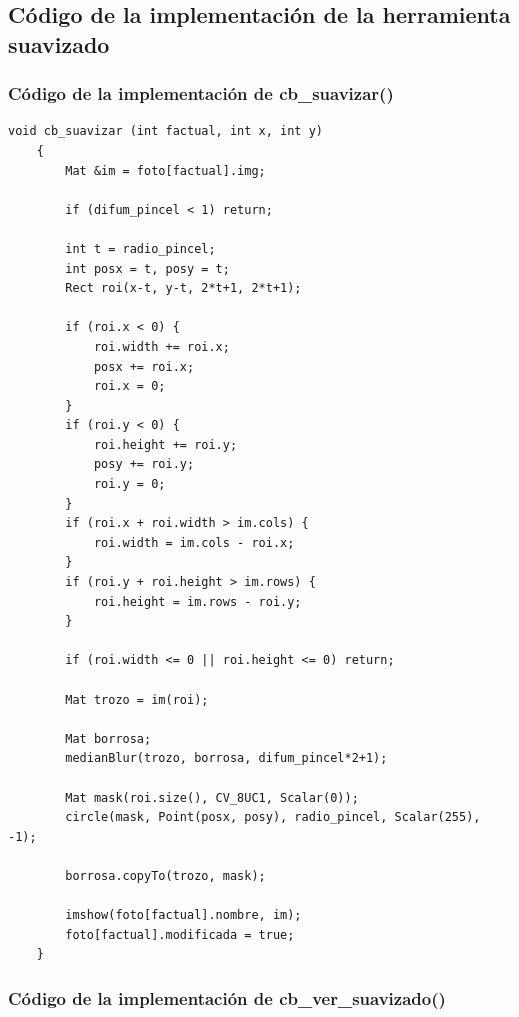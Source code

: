\documentclass[11pt]{article}
\begin{document}
      \clearpage

  \subsection{Código de la implementación de la herramienta suavizado}
      \label{sec:anexo-suavizado}

      \subsubsection{Código de la implementación de cb\_suavizar()}

          \begin{lstlisting}[style=CppQtStyle, caption={Código de la implementación de \texttt{cb\_suavizar()}.}]
    void cb_suavizar (int factual, int x, int y)
    {
        Mat &im = foto[factual].img;

        if (difum_pincel < 1) return;

        int t = radio_pincel;
        int posx = t, posy = t;
        Rect roi(x-t, y-t, 2*t+1, 2*t+1);

        if (roi.x < 0) {
            roi.width += roi.x;
            posx += roi.x;
            roi.x = 0;
        }
        if (roi.y < 0) {
            roi.height += roi.y;
            posy += roi.y;
            roi.y = 0;
        }
        if (roi.x + roi.width > im.cols) {
            roi.width = im.cols - roi.x;
        }
        if (roi.y + roi.height > im.rows) {
            roi.height = im.rows - roi.y;
        }

        if (roi.width <= 0 || roi.height <= 0) return;

        Mat trozo = im(roi);

        Mat borrosa;
        medianBlur(trozo, borrosa, difum_pincel*2+1);

        Mat mask(roi.size(), CV_8UC1, Scalar(0));
        circle(mask, Point(posx, posy), radio_pincel, Scalar(255), -1);

        borrosa.copyTo(trozo, mask);

        imshow(foto[factual].nombre, im);
        foto[factual].modificada = true;
    }
\end{lstlisting}

          \clearpage

      \subsubsection{Código de la implementación de cb\_ver\_suavizado()}
\end{document}
